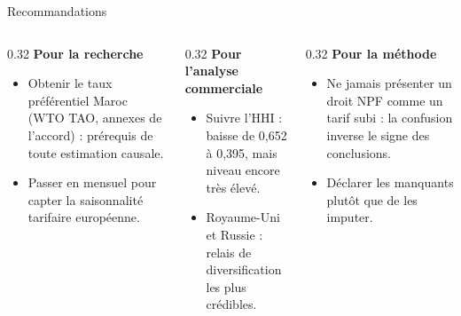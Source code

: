 \documentclass[aspectratio=169,10pt]{beamer}
\begin{document}
\begin{frame}{Recommandations}
  \begin{columns}[T,onlytextwidth]
    \begin{column}{0.32\textwidth}
      \textbf{Pour la recherche}
      \begin{itemize}
        \item Obtenir le taux préférentiel Maroc (WTO TAO, annexes de
              l'accord) : prérequis de toute estimation causale.
        \item Passer en mensuel pour capter la saisonnalité tarifaire
              européenne.
      \end{itemize}
    \end{column}
    \begin{column}{0.32\textwidth}
      \textbf{Pour l'analyse commerciale}
      \begin{itemize}
        \item Suivre l'HHI : baisse de 0,652 à 0,395, mais niveau encore
              très élevé.
        \item Royaume-Uni et Russie : relais de diversification les plus
              crédibles.
      \end{itemize}
    \end{column}
    \begin{column}{0.32\textwidth}
      \textbf{Pour la méthode}
      \begin{itemize}
        \item Ne jamais présenter un droit NPF comme un tarif subi : la
              confusion inverse le signe des conclusions.
        \item Déclarer les manquants plutôt que de les imputer.
      \end{itemize}
    \end{column}
  \end{columns}
\end{frame}
\end{document}
